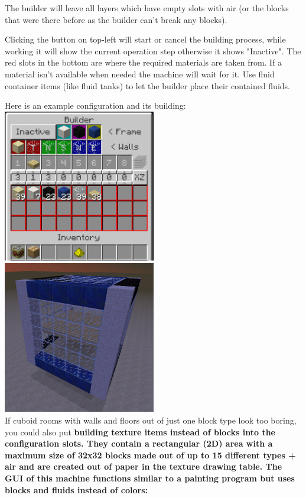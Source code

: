 \documentclass[11pt]{article} %
\begin{document}
The builder will leave all layers which have empty slots with air (or the blocks that were there before as the builder can't break any blocks).

Clicking the button on top-left will start or cancel the building process, while working it will show the current operation step otherwise it shows "Inactive". The red slots in the bottom are where the required materials are taken from. If a material isn't available when needed the machine will wait for it. Use fluid container items (like fluid tanks) to let the builder place their contained fluids.

Here is an example configuration and its building: \\
\includegraphics[width = 0.5\textwidth]{buildCfgEx} \includegraphics[width = 0.5\textwidth]{buildingEx} \\
If cuboid rooms with walls and floors out of just one block type look too boring, you could also put \bf building texture \rm items instead of blocks into the configuration slots. They contain a rectangular (2D) area with a maximum size of 32x32 blocks made out of up to 15 different types + air and are created out of paper in the \bf texture drawing table\rm . The GUI of this machine functions similar to a painting program but uses blocks and fluids instead of colors: \\
\end{document}
